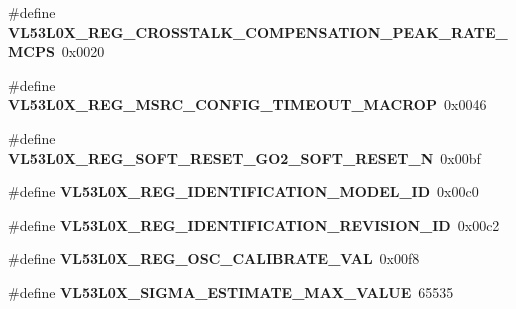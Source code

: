 \begin{DoxyCompactItemize}
\item 
\mbox{\label{group__VL53L0X__DefineRegisters__group_ga1bf7573b6078767d81bdaa6fea783d32}} 
\#define {\bfseries V\+L53\+L0\+X\+\_\+\+R\+E\+G\+\_\+\+C\+R\+O\+S\+S\+T\+A\+L\+K\+\_\+\+C\+O\+M\+P\+E\+N\+S\+A\+T\+I\+O\+N\+\_\+\+P\+E\+A\+K\+\_\+\+R\+A\+T\+E\+\_\+\+M\+C\+PS}~0x0020
\item 
\mbox{\label{group__VL53L0X__DefineRegisters__group_gae7714060576930c235a1b057ce2a7059}} 
\#define {\bfseries V\+L53\+L0\+X\+\_\+\+R\+E\+G\+\_\+\+M\+S\+R\+C\+\_\+\+C\+O\+N\+F\+I\+G\+\_\+\+T\+I\+M\+E\+O\+U\+T\+\_\+\+M\+A\+C\+R\+OP}~0x0046
\item 
\mbox{\label{group__VL53L0X__DefineRegisters__group_gacef20995114a7c7e08b4e70c43936e13}} 
\#define {\bfseries V\+L53\+L0\+X\+\_\+\+R\+E\+G\+\_\+\+S\+O\+F\+T\+\_\+\+R\+E\+S\+E\+T\+\_\+\+G\+O2\+\_\+\+S\+O\+F\+T\+\_\+\+R\+E\+S\+E\+T\+\_\+N}~0x00bf
\item 
\mbox{\label{group__VL53L0X__DefineRegisters__group_ga950094d323fa9a7bc0cb2b4c5caadceb}} 
\#define {\bfseries V\+L53\+L0\+X\+\_\+\+R\+E\+G\+\_\+\+I\+D\+E\+N\+T\+I\+F\+I\+C\+A\+T\+I\+O\+N\+\_\+\+M\+O\+D\+E\+L\+\_\+\+ID}~0x00c0
\item 
\mbox{\label{group__VL53L0X__DefineRegisters__group_gab8d18e8bcefacb6af6526364d19b9313}} 
\#define {\bfseries V\+L53\+L0\+X\+\_\+\+R\+E\+G\+\_\+\+I\+D\+E\+N\+T\+I\+F\+I\+C\+A\+T\+I\+O\+N\+\_\+\+R\+E\+V\+I\+S\+I\+O\+N\+\_\+\+ID}~0x00c2
\item 
\mbox{\label{group__VL53L0X__DefineRegisters__group_gaf7d4b04ec1b17252e95b3f80543072a8}} 
\#define {\bfseries V\+L53\+L0\+X\+\_\+\+R\+E\+G\+\_\+\+O\+S\+C\+\_\+\+C\+A\+L\+I\+B\+R\+A\+T\+E\+\_\+\+V\+AL}~0x00f8
\item 
\mbox{\label{group__VL53L0X__DefineRegisters__group_gacfebe3b882e0da9839055817ef5a66a1}} 
\#define {\bfseries V\+L53\+L0\+X\+\_\+\+S\+I\+G\+M\+A\+\_\+\+E\+S\+T\+I\+M\+A\+T\+E\+\_\+\+M\+A\+X\+\_\+\+V\+A\+L\+UE}~65535
\item 

\end{DoxyCompactItemize}
